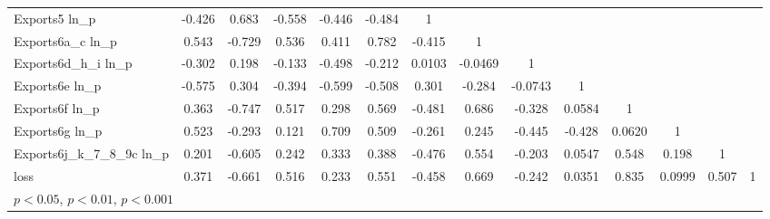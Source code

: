 {\begin{tabular}{l*{13}{c}}
Exports5 ln\_p   &   -0.426\sym{**} &    0.683\sym{***}&   -0.558\sym{***}&   -0.446\sym{***}&   -0.484\sym{***}&        1         &                  &                  &                  &                  &                  &                  &                  \\
Exports6a\_c ln\_p&    0.543\sym{***}&   -0.729\sym{***}&    0.536\sym{***}&    0.411\sym{**} &    0.782\sym{***}&   -0.415\sym{**} &        1         &                  &                  &                  &                  &                  &                  \\
Exports6d\_h\_i ln\_p&   -0.302\sym{*}  &    0.198         &   -0.133         &   -0.498\sym{***}&   -0.212         &   0.0103         &  -0.0469         &        1         &                  &                  &                  &                  &                  \\
Exports6e ln\_p  &   -0.575\sym{***}&    0.304\sym{*}  &   -0.394\sym{**} &   -0.599\sym{***}&   -0.508\sym{***}&    0.301\sym{*}  &   -0.284\sym{*}  &  -0.0743         &        1         &                  &                  &                  &                  \\
Exports6f ln\_p  &    0.363\sym{**} &   -0.747\sym{***}&    0.517\sym{***}&    0.298\sym{*}  &    0.569\sym{***}&   -0.481\sym{***}&    0.686\sym{***}&   -0.328\sym{*}  &   0.0584         &        1         &                  &                  &                  \\
Exports6g ln\_p  &    0.523\sym{***}&   -0.293\sym{*}  &    0.121         &    0.709\sym{***}&    0.509\sym{***}&   -0.261         &    0.245         &   -0.445\sym{***}&   -0.428\sym{**} &   0.0620         &        1         &                  &                  \\
Exports6j\_k\_7\_8\_9c ln\_p&    0.201         &   -0.605\sym{***}&    0.242         &    0.333\sym{*}  &    0.388\sym{**} &   -0.476\sym{***}&    0.554\sym{***}&   -0.203         &   0.0547         &    0.548\sym{***}&    0.198         &        1         &                  \\
loss            &    0.371\sym{**} &   -0.661\sym{***}&    0.516\sym{***}&    0.233         &    0.551\sym{***}&   -0.458\sym{***}&    0.669\sym{***}&   -0.242         &   0.0351         &    0.835\sym{***}&   0.0999         &    0.507\sym{***}&        1         \\
\hline\hline
\multicolumn{14}{l}{\footnotesize \sym{*} \(p<0.05\), \sym{**} \(p<0.01\), \sym{***} \(p<0.001\)}\\
\end{tabular}
}
